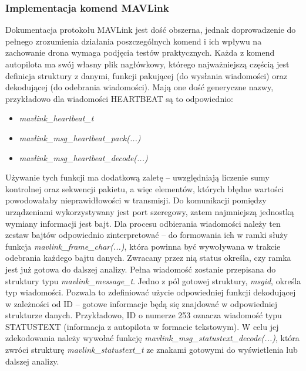 \subsubsection{Implementacja komend MAVLink}
\label{commands}
Dokumentacja protokołu MAVLink jest dość obszerna, jednak doprowadzenie do pełnego zrozumienia działania poszczególnych komend i ich wpływu na zachowanie drona wymaga podjęcia testów praktycznych.
Każda z komend autopilota ma swój własny plik nagłówkowy, którego najważniejszą częścią jest definicja struktury z danymi, funkcji pakującej (do wysłania wiadomości) oraz dekodującej (do odebrania wiadomości). Mają one dość generyczne nazwy, przykładowo dla wiadomości HEARTBEAT są to odpowiednio:
\begin{itemize}
	\item \textit{mavlink\_heartbeat\_t}
	\item \textit{mavlink\_msg\_heartbeat\_pack(...)}
	\item \textit{mavlink\_msg\_heartbeat\_decode(...)}
\end{itemize}
Używanie tych funkcji ma dodatkową zaletę -- uwzględniają liczenie sumy kontrolnej oraz sekwencji pakietu, a więc elementów, których błędne wartości powodowałaby nieprawidłowości w transmisji.
Do komunikacji pomiędzy urządzeniami wykorzystywany jest port szeregowy, zatem najmniejszą jednostką wymiany informacji jest bajt. 
Dla procesu odbierania wiadomości należy ten zestaw bajtów odpowiednio zinterpretować -- do formowania ich w ramki służy funkcja \textit{mavlink\_frame\_char(...)}, która powinna być wywoływana w trakcie odebrania każdego bajtu danych. 
Zwracany przez nią status określa, czy ramka jest już gotowa do dalszej analizy. 
Pełna wiadomość zostanie przepisana do struktury typu \textit{mavlink\_message\_t}. 
Jedno z pól gotowej struktury, \textit{msgid}, określa typ wiadomości. 
Pozwala to zdefiniować użycie odpowiedniej funkcji dekodującej w zależności od ID -- gotowe informacje będą się znajdować w odpowiedniej strukturze danych.
Przykładowo, ID o numerze 253 oznacza wiadomość typu STATUSTEXT (informacja z autopilota w formacie tekstowym). 
W celu jej zdekodowania należy wywołać funkcję \textit{mavlink\_msg\_statustext\_decode(...)}, która zwróci strukturę \textit{mavlink\_statustext\_t} ze znakami gotowymi do wyświetlenia lub dalszej analizy.

